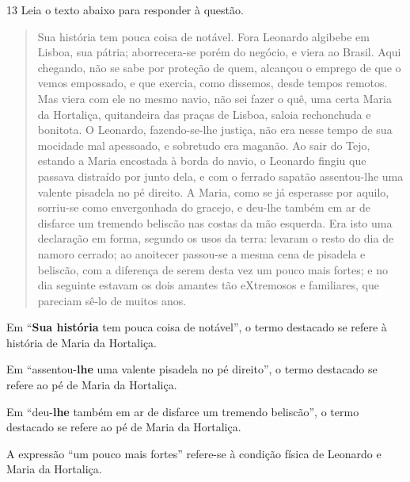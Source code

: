 \pagebreak

\num{13} Leia o texto abaixo para responder à questão. 

\begin{quote}

Sua história tem pouca coisa de notável. Fora Leonardo
algibebe em Lisboa, sua pátria; aborrecera-se porém do negócio,
e viera ao Brasil. Aqui chegando, não se sabe por proteção de
quem, alcançou o emprego de que o vemos empossado, e que
exercia, como dissemos, desde tempos remotos. Mas viera com
ele no mesmo navio, não sei fazer o quê, uma certa Maria da
Hortaliça, quitandeira das praças de Lisboa, saloia rechonchuda e
bonitota. O Leonardo, fazendo-se-lhe justiça, não era nesse tempo
de sua mocidade mal apessoado, e sobretudo era maganão. Ao
sair do Tejo, estando a Maria encostada à borda do navio, o
Leonardo fingiu que passava distraído por junto dela, e com o
ferrado sapatão assentou-lhe uma valente pisadela no pé direito.
A Maria, como se já esperasse por aquilo, sorriu-se como
envergonhada do gracejo, e deu-lhe também em ar de disfarce um
tremendo beliscão nas costas da mão esquerda. Era isto uma
declaração em forma, segundo os usos da terra: levaram o resto
do dia de namoro cerrado; ao anoitecer passou-se a mesma cena
de pisadela e beliscão, com a diferença de serem desta vez um
pouco mais fortes; e no dia seguinte estavam os dois amantes tão
eXtremosos e familiares, que pareciam sê-lo de muitos anos.

\end{quote}


\begin{escolha}

\item
  Em ``\textbf{Sua história} tem pouca coisa de notável'', o termo destacado
  se refere à história de Maria da Hortaliça.
\item
  Em ``assentou-\textbf{lhe} uma valente pisadela no pé direito'', o termo destacado
  se refere ao pé de Maria da Hortaliça.
\item
  Em ``deu-\textbf{lhe} também em ar de disfarce um tremendo beliscão'', o termo 
  destacado se refere ao pé de Maria da Hortaliça.
\item
  A expressão ``um pouco mais fortes'' refere-se à condição física de Leonardo e 
  Maria da Hortaliça.

\end{escolha}

